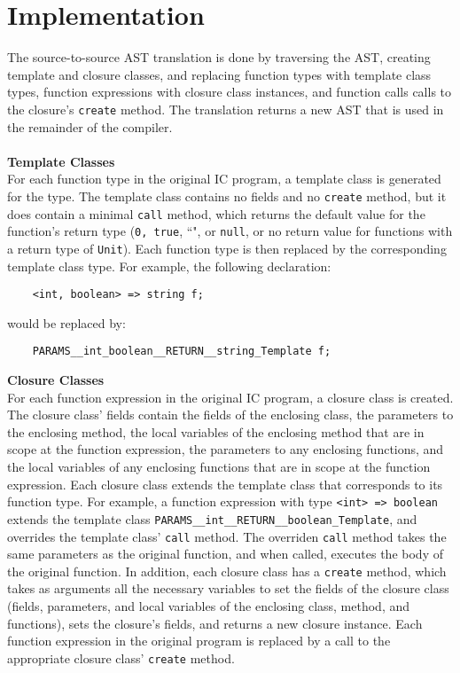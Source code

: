 \documentclass{article}
\begin{document}
\section{Implementation}
\label{implementation}
The source-to-source AST translation is done by traversing the AST, creating template and closure classes, and replacing function types with template class types, function expressions with closure class instances, and function calls calls to the closure's \texttt{create} method. The translation returns a new AST that is used in the remainder of the compiler.\\\\
\textbf{Template Classes}\\
For each function type in the original IC program, a template class is generated for the type. The template class contains no fields and no \texttt{create} method, but it does contain a minimal \texttt{call} method, which returns the default value for the function's return type (\texttt{0, true}, ``", or \texttt{null}, or no return value for functions with a return type of \texttt{Unit}). Each function type is then replaced by the corresponding template class type. For example, the following declaration:
\begin{verbatim}
    <int, boolean> => string f;
\end{verbatim}
would be replaced by:
\begin{verbatim}
    PARAMS__int_boolean__RETURN__string_Template f;
\end{verbatim}
\textbf{Closure Classes}\\
For each function expression in the original IC program, a closure class is created. The closure class' fields contain the fields of the enclosing class, the parameters to the enclosing method, the local variables of the enclosing method that are in scope at the function expression, the parameters to any enclosing functions, and the local variables of any enclosing functions that are in scope at the function expression. Each closure class extends the template class that corresponds to its function type. For example, a function expression with type \texttt{<int> => boolean} extends the template class \texttt{PARAMS\_\_int\_\_RETURN\_\_boolean\_Template}, and overrides the template class' \texttt{call} method. The overriden \texttt{call} method takes the same parameters as the original function, and when called, executes the body of the original function. In addition, each closure class has a \texttt{create} method, which takes as arguments all the necessary variables to set the fields of the closure class (fields, parameters, and local variables of the enclosing class, method, and functions), sets the closure's fields, and returns a new closure instance. Each function expression in the original program is replaced by a call to the appropriate closure class' \texttt{create} method.\\\\
\end{document}
